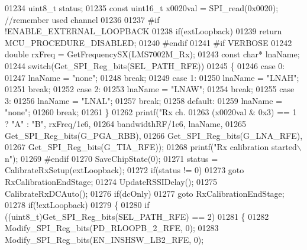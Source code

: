 \begin{DoxyCode}
{{{{{{{{{{{{{{{{{{{{{{{{{{{01234     uint8\_t status;
01235     \textcolor{keyword}{const} uint16\_t x0020val = SPI_read(0x0020); \textcolor{comment}{//remember used channel}
01236 
01237 \textcolor{preprocessor}{#if !ENABLE\_EXTERNAL\_LOOPBACK}
01238     \textcolor{keywordflow}{if}(extLoopback)
01239         \textcolor{keywordflow}{return} MCU_PROCEDURE_DISABLED;
01240 \textcolor{preprocessor}{#endif}
01241 \textcolor{preprocessor}{#if VERBOSE}
01242     \textcolor{keywordtype}{double} rxFreq = GetFrequencySX(LMS7002M_Rx);
01243     \textcolor{keyword}{const} \textcolor{keywordtype}{char}* lnaName;
01244     \textcolor{keywordflow}{switch}(Get_SPI_Reg_bits(SEL_PATH_RFE))
01245     \{
01246     \textcolor{keywordflow}{case} 0:
01247         lnaName = \textcolor{stringliteral}{"none"};
01248         \textcolor{keywordflow}{break};
01249     \textcolor{keywordflow}{case} 1:
01250         lnaName = \textcolor{stringliteral}{"LNAH"};
01251         \textcolor{keywordflow}{break};
01252     \textcolor{keywordflow}{case} 2:
01253         lnaName = \textcolor{stringliteral}{"LNAW"};
01254         \textcolor{keywordflow}{break};
01255     \textcolor{keywordflow}{case} 3:
01256         lnaName = \textcolor{stringliteral}{"LNAL"};
01257         \textcolor{keywordflow}{break};
01258     \textcolor{keywordflow}{default}:
01259         lnaName = \textcolor{stringliteral}{"none"};
01260         \textcolor{keywordflow}{break};
01261     \}
01262     printf(\textcolor{stringliteral}{"Rx ch.%
01263            (x0020val & 0x3) == 1 ? \textcolor{stringliteral}{"A"} : \textcolor{stringliteral}{"B"}, rxFreq/1e6,
01264            bandwidthRF/1e6, lnaName,
01265            Get_SPI_Reg_bits(G_PGA_RBB),
01266            Get_SPI_Reg_bits(G_LNA_RFE),
01267            Get_SPI_Reg_bits(G_TIA_RFE));
01268     printf(\textcolor{stringliteral}{"Rx calibration started\(\backslash\)n"});
01269 \textcolor{preprocessor}{#endif}
01270     SaveChipState(0);
01271     status = CalibrateRxSetup(extLoopback);
01272     \textcolor{keywordflow}{if}(status != 0)
01273         \textcolor{keywordflow}{goto} RxCalibrationEndStage;
01274     UpdateRSSIDelay();
01275     CalibrateRxDCAuto();
01276     \textcolor{keywordflow}{if}(dcOnly)
01277         \textcolor{keywordflow}{goto} RxCalibrationEndStage;
01278     \textcolor{keywordflow}{if}(!extLoopback)
01279     \{
01280         \textcolor{keywordflow}{if} ((uint8\_t)Get_SPI_Reg_bits(SEL_PATH_RFE) == 2)
01281         \{
01282             Modify_SPI_Reg_bits(PD_RLOOPB_2_RFE, 0);
01283             Modify_SPI_Reg_bits(EN_INSHSW_LB2_RFE, 0);
}}}}}}}}}}}}}}}}}}}}}}}}}}}}
\end{DoxyCode}
